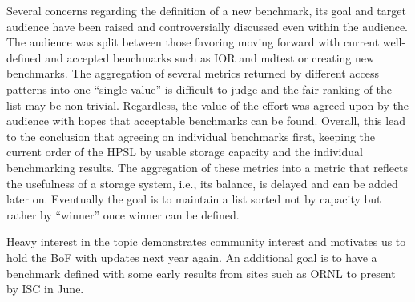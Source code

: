 \documentclass{llncs}
\begin{document}
Several concerns regarding the definition of a new benchmark, its goal and target audience have been raised and controversially discussed even within the audience.  The audience was split between those favoring moving forward with current well-defined and accepted benchmarks such as IOR and mdtest or creating new benchmarks.
The aggregation of several metrics returned by different access patterns into one “single value” is difficult to judge and the fair ranking of the list may be non-trivial.  Regardless, the value of the effort was agreed upon by the audience with hopes that acceptable benchmarks can be found. 
Overall, this lead to the conclusion that agreeing on individual benchmarks first, keeping the current order of the HPSL by usable storage capacity and the individual benchmarking results. The aggregation of these metrics into a metric that reflects the usefulness of a storage system, i.e., its balance, is delayed and can be added later on.  Eventually the goal is to maintain a list sorted not by capacity but rather by “winner” once winner can be defined.


Heavy interest in the topic demonstrates community interest and motivates us to hold the BoF with updates next year again.  An additional goal is to have a benchmark defined with some early results from sites such as ORNL to present by ISC in June.
\end{document}
